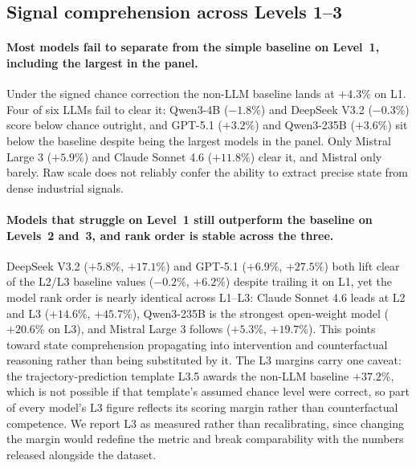 \subsection{Signal comprehension across Levels 1--3}

\paragraph{Most models fail to separate from the simple baseline on Level~1, including the largest in the panel.}
Under the signed chance correction the non-LLM baseline lands at $+4.3\%$ on L1. Four of six LLMs fail to clear it: Qwen3-4B ($-1.8\%$) and DeepSeek V3.2 ($-0.3\%$) score below chance outright, and GPT-5.1 ($+3.2\%$) and Qwen3-235B ($+3.6\%$) sit below the baseline despite being the largest models in the panel. Only Mistral Large 3 ($+5.9\%$) and Claude Sonnet 4.6 ($+11.8\%$) clear it, and Mistral only barely. Raw scale does not reliably confer the ability to extract precise state from dense industrial signals.

\paragraph{Models that struggle on Level~1 still outperform the baseline on Levels~2 and~3, and rank order is stable across the three.}
DeepSeek V3.2 ($+5.8\%$, $+17.1\%$) and GPT-5.1 ($+6.9\%$, $+27.5\%$) both lift clear of the L2/L3 baseline values ($-0.2\%$, $+6.2\%$) despite trailing it on L1, yet the model rank order is nearly identical across L1--L3: Claude Sonnet 4.6 leads at L2 and L3 ($+14.6\%$, $+45.7\%$), Qwen3-235B is the strongest open-weight model ($+20.6\%$ on L3), and Mistral Large 3 follows ($+5.3\%$, $+19.7\%$). This points toward state comprehension propagating into intervention and counterfactual reasoning rather than being substituted by it. The L3 margins carry one caveat: the trajectory-prediction template L3.5 awards the non-LLM baseline $+37.2\%$, which is not possible if that template's assumed chance level were correct, so part of every model's L3 figure reflects its scoring margin rather than counterfactual competence. We report L3 as measured rather than recalibrating, since changing the margin would redefine the metric and break comparability with the numbers released alongside the dataset.

